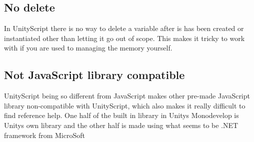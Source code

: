 \subsection {No delete}
In UnityScript there is no way to delete a variable after is has been created or instantiated other than letting it go out of scope. This makes it tricky to work with if you are used to managing the memory yourself.
\subsection {Not JavaScript library compatible}
UnityScript being so different from JavaScript makes other pre-made JavaScript library non-compatible with UnityScript, which also makes it really difficult to find reference help. One half of the built in library in Unitys Monodevelop is Unitys own library and the other half is made using what seems to be .NET framework from MicroSoft
